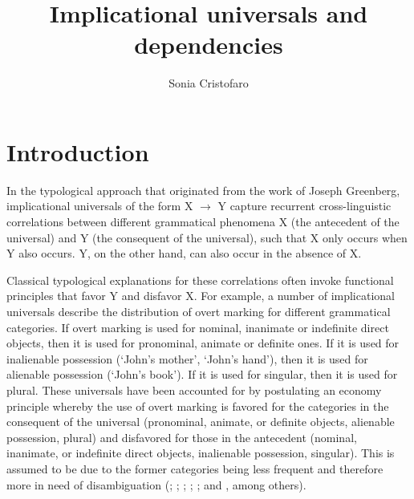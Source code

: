 \documentclass[output=paper]{langsci/langscibook}
\author{Sonia Cristofaro\affiliation{University of Pavia}}
\title{Implicational universals and dependencies}
\begin{document}
 
\section{Introduction}
In the typological approach that originated from the work of Joseph
Greenberg, implicational universals of the form X $\rightarrow$ Y
capture recurrent cross-linguistic correlations between different
grammatical phenomena X (the antecedent of the universal) and Y (the
consequent of the universal), such that  X only occurs when Y also
occurs. Y, on the other hand, can also occur in the absence of X.


Classical typological explanations for these  correlations often
invoke functional principles that  favor Y and disfavor X. For
example,  a number of implicational universals describe the
distribution of overt marking for different grammatical categories. If
overt marking is used for nominal, inanimate or indefinite direct
objects, then it is used for pronominal, animate  or definite ones. If
it is used  for inalienable possession (`John's mother', `John's
hand'), then it is used for alienable possession (`John's book'). If
it is used for singular, then it is used for plural. These universals
have  been accounted for by postulating an economy principle whereby
the use of overt marking  is favored for the categories in the consequent
of the universal (pronominal, animate, or definite objects,
alienable possession, plural) and disfavored for those in the
antecedent (nominal, inanimate, or indefinite direct objects, inalienable
possession, singular). This is assumed to be due to  the former categories being less frequent and
therefore more in need of disambiguation (\citealt{Greenberg1966universals}; \citealt{Nichols1988}; \citealt{Comrie2};
  \citealt{Dixon1994};  \citealt{TU2}; \citealt{Martinmarkedness} and
  \citealt{Haspelmath2008}, among others).
\end{document}

